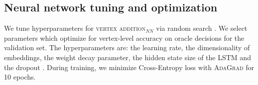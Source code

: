 \subsection{Neural network tuning and optimization}
We tune hyperparameters for \textsc{vertex addition}$_{NN}$ via random search \cite{Bergstra2012RandomSF}. We select parameters which optimize for vertex-level accuracy on oracle decisions for the validation set. The hyperparameters are: the learning rate, the dimensionality of embeddings, the weight decay parameter, the hidden state size of the LSTM and the dropout . During training, we minimize Cross-Entropy loss with \textsc{AdaGrad} \cite{duchi2011adaptive} for 10 epochs.

\begin{table}[htb!]
\centering
{}
\caption{Hyperparamters for \textsc{vertex addition}$_{NN}$}
\end{table}



